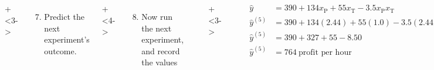\documentclass[handout,11pt,aspectratio=169,mathserif]{beamer}
\begin{document}
\begin{frame}
	\vspace{-1.1cm}
	\begin{columns}[T]

			\vspace{1cm}
			\onslide+<3->{
				{\tiny 
					\begin{enumerate}\setcounter{enumi}{6}
						\item	Predict the next experiment's outcome.
					\end{enumerate}
				
				\par}
			}
			
			\vspace{2cm}
			\onslide+<4->{
				{\tiny 
					\begin{enumerate}\setcounter{enumi}{7}
						\item	Now run the next experiment, and record the values
					\end{enumerate}
				
				\par}
			}
			
			\rule[3mm]{0.01cm}{85mm}%
			
			
			\vspace{1cm}
			
			
			
			\onslide+<3->{	
				\hrule
				
				\begin{align*}
					\hat{y} &= 390 + 134 x_\text{P} + 55 x_\text{T} - 3.5x_\text{P}x_\text{T} \\
					\hat{y}^{(5)} &= 390 + 134 (2.44) + 55 (1.0) - 3.5(2.44)(1.0)\\
					\hat{y}^{(5)} &= 390 + 327 + 55 - 8.50\\
					\hat{y}^{(5)} &= 764~\text{profit per hour}
				\end{align*}
			}
			
			\vspace{-1.15cm}
			\onslide+<4->{	
				\begin{align*}
					y^{(5)} &= \$669~\text{profit per hour}
				\end{align*}
			}
	\end{columns}
\end{frame}
\end{document}
